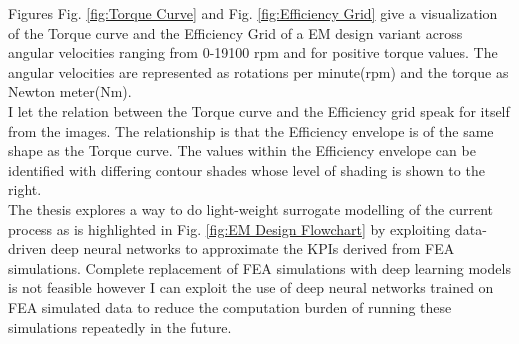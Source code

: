 \documentclass{report} %
\begin{document}
Figures Fig. \ref{fig:Torque Curve} and Fig. \ref{fig:Efficiency Grid} give a visualization of the Torque curve and the Efficiency Grid of a \ac{EM} design variant 
across angular velocities ranging from 0-19100 rpm and for positive torque values.
The angular velocities are represented as rotations per minute(rpm) and the torque as Newton meter(Nm).\\
I let the relation between the Torque curve and the Efficiency grid speak for itself from the images.
The relationship is that the Efficiency envelope is of the same shape as the Torque curve. 
The values within the Efficiency envelope can be identified with differing contour shades whose level of shading is shown to the right.\\

The thesis explores a way to do light-weight surrogate modelling of the current process as is highlighted in Fig. \ref{fig:EM Design Flowchart} by 
exploiting data-driven deep neural networks to approximate the \ac{KPI}s derived from \ac{FEA} simulations.
Complete replacement of \ac{FEA} simulations with deep learning models is not feasible however I can exploit the use of deep neural networks 
trained on \ac{FEA} simulated data to reduce the computation burden of running these simulations repeatedly in the future.\\
\end{document}

